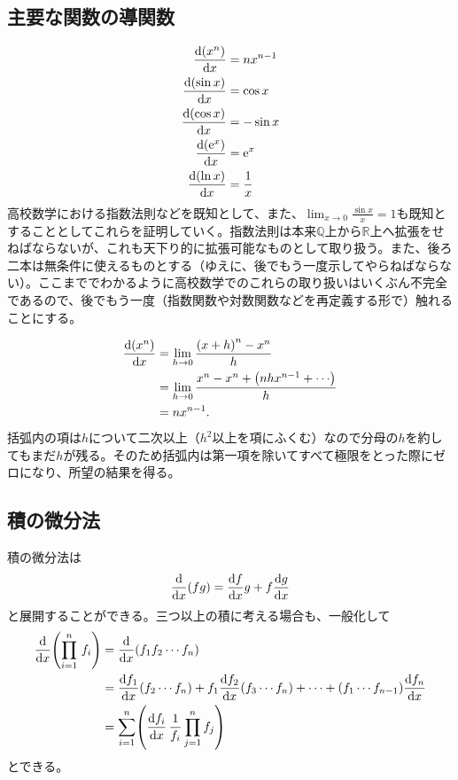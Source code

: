 \subsection{主要な関数の導関数}
\begin{align}
    \begin{aligned}
        \diff{\pare{x^n}}{x}          & =nx^{n-1}     \\
        \diff{\pare{\sin x}}{x}       & =\cos x       \\
        \diff{\pare{\cos x}}{x}       & =-\sin x      \\
        \diff{\pare{\mathrm{e}^x}}{x} & =\mathrm{e}^x \\
        \diff{\pare{\ln x}}{x}        & =\frac{1}x
    \end{aligned}\label{eq:1.3}
\end{align}
高校数学における指数法則などを既知として、また、$\lim_{x\to 0}\frac{\sin x}{x}=1$も既知とすることとしてこれらを証明していく。指数法則は本来$\mathbb{Q}$上から$\mathbb{R}$上へ拡張をせねばならないが、これも天下り的に拡張可能なものとして取り扱う。また、後ろ二本は無条件に使えるものとする（ゆえに、後でもう一度示してやらねばならない）。ここまででわかるように高校数学でのこれらの取り扱いはいくぶん不完全であるので、後でもう一度（指数関数や対数関数などを再定義する形で）触れることにする。

\begin{align*}
    \diff{\pare{x^n}}{x} & =\lim_{h\to 0}\frac{\pare{x+h}^{n}-x^n}{h}              \\
                         & =\lim_{h\to 0}\frac{x^n-x^n+\pare{nhx^{n-1}+\cdots}}{h} \\
                         & =nx^{n-1}.
\end{align*}
括弧内の項は$h$について二次以上（$h^2$以上を項にふくむ）なので分母の$h$を約してもまだ$h$が残る。そのため括弧内は第一項を除いてすべて極限をとった際にゼロになり、所望の結果を得る。

\subsection{積の微分法}
積の微分法は
\begin{align*}
    \opdiff{x}\pare{fg}=\diff{f}xg+f\diff{g}x
\end{align*}
と展開することができる。三つ以上の積に考える場合も、一般化して
\begin{align*}
    \opdiff{x}\pare{\prod_{i=1}^n\,f_i} & =\opdiff{x}\pare{f_1f_2\cdots{}f_n}                                                                                   \\
                                        & =\diff{f_1}{x}\pare{f_2\cdots{}f_n}+f_1\diff{f_2}x{}\pare{f_3\cdots{}f_n}+\cdots+\pare{f_1\cdots{}f_{n-1}}\diff{f_n}x \\
                                        & =\sum_{i=1}^{n}\pare{\diff{f_i}x\,\frac{1}{f_i}\prod_{j=1}^n{}f_j}
\end{align*}
とできる。

